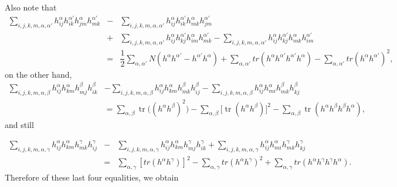\documentclass[leqno,11pt]{amsart}
\theoremstyle{plain}
\theoremstyle{definition}
\numberwithin{equation}{section}
\begin{document}
Also note that
\begin{eqnarray*}
\sum_{i,j,k,m,\alpha,\alpha'}h_{ij}^{\alpha}h_{ik}^{\alpha'}h_{jm}^{\alpha}h_{mk}^{\alpha'}&-&\sum_{i,j,k,m,\alpha,\alpha'}h_{ij}^{\alpha}h_{ik}^{\alpha'}h_{mk}^{\alpha}h_{jm}^{\alpha'}\\&+&\sum_{i,j,k,m,\alpha,\alpha'}h_{ij}^{\alpha}h_{kj}^{\alpha'}h_{im}^{\alpha}h_{mk}^{\alpha'}-\sum_{i,j,k,m,\alpha,\alpha'}h_{ij}^{\alpha}h_{kj}^{\alpha'}h_{mk}^{\alpha}h_{im}^{\alpha'}\\
&=&\dfrac{1}{2}\sum_{\alpha,\alpha'}N(h^{\alpha}h^{\alpha'}-h^{\alpha'}h^{\alpha})+\sum_{\alpha,\alpha'}tr(h^{\alpha}h^{\alpha'}h^{\alpha'}h^{\alpha})-\sum_{\alpha,\alpha'}tr(h^{\alpha}h^{\alpha'})^2,
\end{eqnarray*}
on the other hand,
$$
\begin{aligned}
\sum_{i,j,k,m,\alpha,\beta} h_{ij}^{\alpha}h_{km}^{\alpha}h_{mj}^{\beta}h_{ik}^{\beta}
&- \sum_{i,j,k,m,\alpha,\beta} h_{ij}^{\alpha}h_{km}^{\alpha}h_{mk}^{\beta}h_{ij}^{\beta} - \sum_{i,j,k,m,\alpha,\beta} h_{ij}^{\alpha}h_{mi}^{\alpha}h_{mk}^{\beta}h_{kj}^{\beta} \\[6pt]
& = \sum_{\alpha,\beta} \operatorname{tr}\!\big((h^{\alpha}h^{\beta})^2\big)
   - \sum_{\alpha,\beta} \big[\operatorname{tr}(h^{\alpha}h^{\beta})\big]^2
   - \sum_{\alpha,\beta} \operatorname{tr}(h^{\alpha}h^{\beta}h^{\beta}h^{\alpha}),
\end{aligned}
$$
and still

\begin{eqnarray*}
\sum_{i,j,k,m,\alpha,\gamma}h_{ij}^{\alpha}h_{km}^{\alpha}h_{mk}^{\gamma}h_{ij}^{\gamma}&-&\sum_{i,j,k,m,\alpha,\gamma}h_{ij}^{\alpha}h_{km}^{\alpha}h_{mj}^{\gamma}h_{ik}^{\gamma}+\sum_{i,j,k,m,\alpha,\gamma}h_{ij}^{\alpha}h_{mi}^{\alpha}h_{mk}^{\gamma}h_{kj}^{\gamma}\\
&=&\sum_{\alpha,\gamma}[tr(h^{\alpha}h^{\gamma})]^2-\sum_{\alpha,\gamma}tr(h^{\alpha}h^{\gamma})^2 +\sum_{\alpha,\gamma}tr(h^{\alpha}h^{\gamma}h^{\gamma}h^{\alpha}).
\end{eqnarray*}
Therefore of these last four equalities, we obtain
\end{document}
